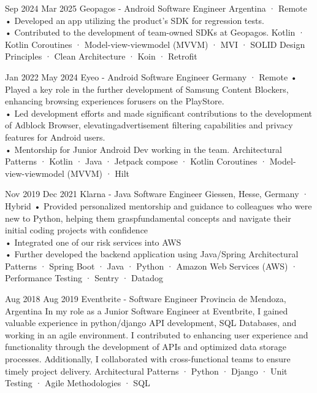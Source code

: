 \documentclass[a4paper,nocolors]{cv-friggeri-x}
\begin{document}
\begin{entrylist}


\entryexperience
{Sep 2024}
{Mar 2025}
{Geopagos - Android Software Engineer}
{Argentina · Remote}
{
• Developed an app utilizing the product's SDK for regression tests.\\
• Contributed to the development of team-owned SDKs at Geopagos.
}
{
  Kotlin · Kotlin Coroutines · Model-view-viewmodel (MVVM) · MVI · SOLID Design Principles · Clean Architecture · Koin · Retrofit
}


\entryexperience
{Jan 2022}
{May 2024}
{Eyeo - Android Software Engineer}
{Germany · Remote}
{
• Played a key role in the further development of Samsung Content Blockers, enhancing browsing experiences forusers on the PlayStore.
\\
• Led development efforts and made significant contributions to the
development of Adblock Browser, elevatingadvertisement filtering capabilities and privacy features for Android users.
\\
• Mentorship for Junior Android Dev working in the team.
}
{
  Architectural Patterns · Kotlin · Java · Jetpack compose · Kotlin Coroutines · Model-view-viewmodel (MVVM) · Hilt
}


\entryexperience
{Nov 2019}
{Dec 2021}
{Klarna - Java Software Engineer}
{Giessen, Hesse, Germany · Hybrid}
{
  • Provided personalized mentorship and guidance to colleagues who were new to Python, helping them graspfundamental concepts and navigate their initial coding projects with confidence
  \\
  • Integrated one of our risk services into AWS
  \\
  • Further developed the backend application using Java/Spring
}
{ 
  Architectural Patterns · Spring Boot  · Java · Python · Amazon Web Services (AWS) · Performance Testing · Sentry · Datadog
}


\entryexperience
{Aug 2018}
{Aug 2019}
{Eventbrite - Software Engineer}
{Provincia de Mendoza, Argentina}
{
  In my role as a Junior Software Engineer at Eventbrite, I gained valuable experience in python/django API development, SQL Databases, and working in an agile environment. I contributed to enhancing user experience and functionality through the development of APIs and optimized data storage processes. Additionally, I collaborated with cross-functional teams to ensure timely project delivery.
}
{
  Architectural Patterns · Python · Django · Unit Testing · Agile Methodologies · SQL
}


\end{entrylist}
\end{document}
